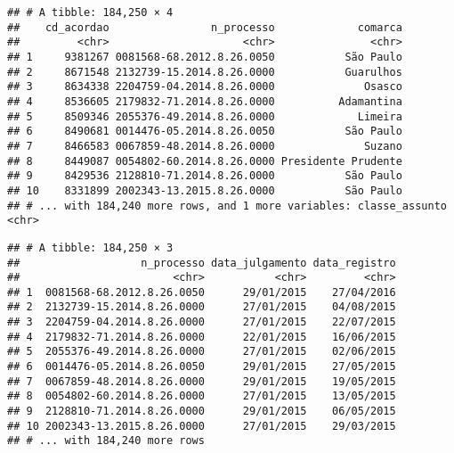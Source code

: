 \documentclass[]{book}
\newenvironment{Shaded}{\begin{snugshade}}{\end{snugshade}}
\newcommand{\KeywordTok}[1]{\textcolor[rgb]{0.13,0.29,0.53}{\textbf{{#1}}}}
\newcommand{\StringTok}[1]{\textcolor[rgb]{0.31,0.60,0.02}{{#1}}}
\newcommand{\NormalTok}[1]{{#1}}
\begin{document}
\begin{Shaded}
\end{Shaded}

\begin{verbatim}
## # A tibble: 184,250 × 4
##    cd_acordao                n_processo             comarca
##         <chr>                     <chr>               <chr>
## 1     9381267 0081568-68.2012.8.26.0050           São Paulo
## 2     8671548 2132739-15.2014.8.26.0000           Guarulhos
## 3     8634338 2204759-04.2014.8.26.0000              Osasco
## 4     8536605 2179832-71.2014.8.26.0000          Adamantina
## 5     8509346 2055376-49.2014.8.26.0000             Limeira
## 6     8490681 0014476-05.2014.8.26.0050           São Paulo
## 7     8466583 0067859-48.2014.8.26.0000              Suzano
## 8     8449087 0054802-60.2014.8.26.0000 Presidente Prudente
## 9     8429536 2128810-71.2014.8.26.0000           São Paulo
## 10    8331899 2002343-13.2015.8.26.0000           São Paulo
## # ... with 184,240 more rows, and 1 more variables: classe_assunto <chr>
\end{verbatim}

\begin{Shaded}
\end{Shaded}

\begin{verbatim}
## # A tibble: 184,250 × 3
##                   n_processo data_julgamento data_registro
##                        <chr>           <chr>         <chr>
## 1  0081568-68.2012.8.26.0050      29/01/2015    27/04/2016
## 2  2132739-15.2014.8.26.0000      27/01/2015    04/08/2015
## 3  2204759-04.2014.8.26.0000      27/01/2015    22/07/2015
## 4  2179832-71.2014.8.26.0000      22/01/2015    16/06/2015
## 5  2055376-49.2014.8.26.0000      27/01/2015    02/06/2015
## 6  0014476-05.2014.8.26.0050      29/01/2015    27/05/2015
## 7  0067859-48.2014.8.26.0000      29/01/2015    19/05/2015
## 8  0054802-60.2014.8.26.0000      27/01/2015    13/05/2015
## 9  2128810-71.2014.8.26.0000      29/01/2015    06/05/2015
## 10 2002343-13.2015.8.26.0000      27/01/2015    29/03/2015
## # ... with 184,240 more rows
\end{verbatim}
\end{document}
